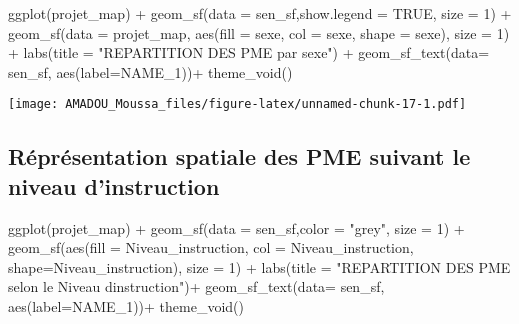 \documentclass[
  14pt,
]{article}
\newenvironment{Shaded}{\begin{snugshade}}{\end{snugshade}}
\newcommand{\AttributeTok}[1]{\textcolor[rgb]{0.77,0.63,0.00}{#1}}
\newcommand{\ConstantTok}[1]{\textcolor[rgb]{0.00,0.00,0.00}{#1}}
\newcommand{\DecValTok}[1]{\textcolor[rgb]{0.00,0.00,0.81}{#1}}
\newcommand{\FunctionTok}[1]{\textcolor[rgb]{0.00,0.00,0.00}{#1}}
\newcommand{\NormalTok}[1]{#1}
\newcommand{\SpecialCharTok}[1]{\textcolor[rgb]{0.00,0.00,0.00}{#1}}
\newcommand{\StringTok}[1]{\textcolor[rgb]{0.31,0.60,0.02}{#1}}
\begin{document}
\begin{Shaded}
\begin{Highlighting}[]
 \FunctionTok{ggplot}\NormalTok{(projet\_map) }\SpecialCharTok{+}
  \FunctionTok{geom\_sf}\NormalTok{(}\AttributeTok{data =}\NormalTok{ sen\_sf,}\AttributeTok{show.legend =} \ConstantTok{TRUE}\NormalTok{, }\AttributeTok{size =} \DecValTok{1}\NormalTok{) }\SpecialCharTok{+}
  \FunctionTok{geom\_sf}\NormalTok{(}\AttributeTok{data =}\NormalTok{ projet\_map, }\FunctionTok{aes}\NormalTok{(}\AttributeTok{fill =}\NormalTok{ sexe,}
                                 \AttributeTok{col =}\NormalTok{ sexe, }
                                 \AttributeTok{shape =}\NormalTok{ sexe),}
          \AttributeTok{size =} \DecValTok{1}\NormalTok{) }\SpecialCharTok{+}
  \FunctionTok{labs}\NormalTok{(}\AttributeTok{title =} \StringTok{"REPARTITION DES PME par sexe"}\NormalTok{) }\SpecialCharTok{+}
  \FunctionTok{geom\_sf\_text}\NormalTok{(}\AttributeTok{data=}\NormalTok{ sen\_sf,}
               \FunctionTok{aes}\NormalTok{(}\AttributeTok{label=}\NormalTok{NAME\_1))}\SpecialCharTok{+}
  \FunctionTok{theme\_void}\NormalTok{()}
\end{Highlighting}
\end{Shaded}

\texttt{[image: AMADOU\_Moussa\_files/figure-latex/unnamed-chunk-17-1.pdf]}

\hypertarget{ruxe9pruxe9sentation-spatiale-des-pme-suivant-le-niveau-dinstruction}{%
\subsection{\texorpdfstring{\textbf{Réprésentation spatiale des PME
suivant le niveau d'instruction}\\
}{Réprésentation spatiale des PME suivant le niveau d'instruction }}\label{ruxe9pruxe9sentation-spatiale-des-pme-suivant-le-niveau-dinstruction}}

\begin{Shaded}
\begin{Highlighting}[]
\FunctionTok{ggplot}\NormalTok{(projet\_map) }\SpecialCharTok{+}
  \FunctionTok{geom\_sf}\NormalTok{(}\AttributeTok{data =}\NormalTok{ sen\_sf,}\AttributeTok{color =} \StringTok{"grey"}\NormalTok{, }
          \AttributeTok{size =} \DecValTok{1}\NormalTok{) }\SpecialCharTok{+}
  \FunctionTok{geom\_sf}\NormalTok{(}\FunctionTok{aes}\NormalTok{(}\AttributeTok{fill =}\NormalTok{ Niveau\_instruction, }
              \AttributeTok{col =}\NormalTok{ Niveau\_instruction, }
              \AttributeTok{shape=}\NormalTok{Niveau\_instruction), }
          \AttributeTok{size =} \DecValTok{1}\NormalTok{) }\SpecialCharTok{+}
   \FunctionTok{labs}\NormalTok{(}\AttributeTok{title =} \StringTok{"REPARTITION DES PME selon le Niveau d\textquotesingle{}instruction"}\NormalTok{)}\SpecialCharTok{+}
  \FunctionTok{geom\_sf\_text}\NormalTok{(}\AttributeTok{data=}\NormalTok{ sen\_sf,}
               \FunctionTok{aes}\NormalTok{(}\AttributeTok{label=}\NormalTok{NAME\_1))}\SpecialCharTok{+}
  \FunctionTok{theme\_void}\NormalTok{()}
\end{Highlighting}
\end{Shaded}
\end{document}
